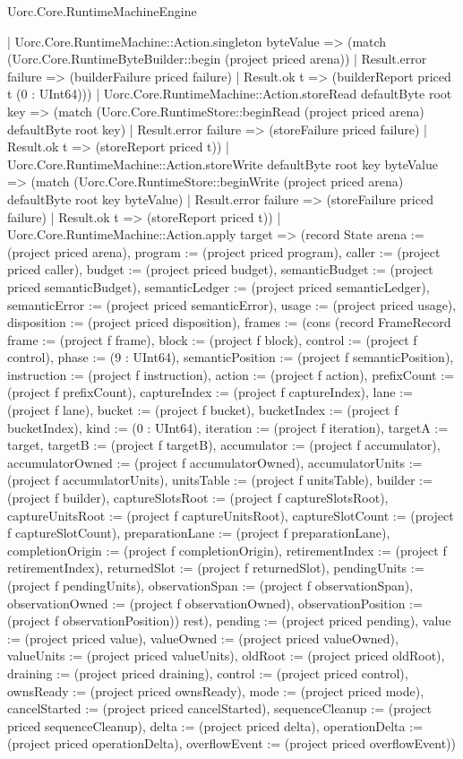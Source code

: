 \begin{lexlean}{Uorc.Core.RuntimeMachineEngine}
\begin{semanticmodule}
{              | Uorc.Core.RuntimeMachine::Action.singleton byteValue => (match (Uorc.Core.RuntimeByteBuilder::begin (project priced arena))
                | Result.error failure => (builderFailure priced failure)
                | Result.ok t => (builderReport priced t (0 : UInt64)))
              | Uorc.Core.RuntimeMachine::Action.storeRead defaultByte root key => (match (Uorc.Core.RuntimeStore::beginRead (project priced arena) defaultByte root key)
                | Result.error failure => (storeFailure priced failure)
                | Result.ok t => (storeReport priced t))
              | Uorc.Core.RuntimeMachine::Action.storeWrite defaultByte root key byteValue => (match (Uorc.Core.RuntimeStore::beginWrite (project priced arena) defaultByte root key byteValue)
                | Result.error failure => (storeFailure priced failure)
                | Result.ok t => (storeReport priced t))
              | Uorc.Core.RuntimeMachine::Action.apply target => (record State {arena := (project priced arena), program := (project priced program), caller := (project priced caller), budget := (project priced budget), semanticBudget := (project priced semanticBudget), semanticLedger := (project priced semanticLedger), semanticError := (project priced semanticError), usage := (project priced usage), disposition := (project priced disposition), frames := (cons (record FrameRecord {frame := (project f frame), block := (project f block), control := (project f control), phase := (9 : UInt64), semanticPosition := (project f semanticPosition), instruction := (project f instruction), action := (project f action), prefixCount := (project f prefixCount), captureIndex := (project f captureIndex), lane := (project f lane), bucket := (project f bucket), bucketIndex := (project f bucketIndex), kind := (0 : UInt64), iteration := (project f iteration), targetA := target, targetB := (project f targetB), accumulator := (project f accumulator), accumulatorOwned := (project f accumulatorOwned), accumulatorUnits := (project f accumulatorUnits), unitsTable := (project f unitsTable), builder := (project f builder), captureSlotsRoot := (project f captureSlotsRoot), captureUnitsRoot := (project f captureUnitsRoot), captureSlotCount := (project f captureSlotCount), preparationLane := (project f preparationLane), completionOrigin := (project f completionOrigin), retirementIndex := (project f retirementIndex), returnedSlot := (project f returnedSlot), pendingUnits := (project f pendingUnits), observationSpan := (project f observationSpan), observationOwned := (project f observationOwned), observationPosition := (project f observationPosition)}) rest), pending := (project priced pending), value := (project priced value), valueOwned := (project priced valueOwned), valueUnits := (project priced valueUnits), oldRoot := (project priced oldRoot), draining := (project priced draining), control := (project priced control), ownsReady := (project priced ownsReady), mode := (project priced mode), cancelStarted := (project priced cancelStarted), sequenceCleanup := (project priced sequenceCleanup), delta := (project priced delta), operationDelta := (project priced operationDelta), overflowEvent := (project priced overflowEvent)})
}
\end{semanticmodule}
\end{lexlean}
